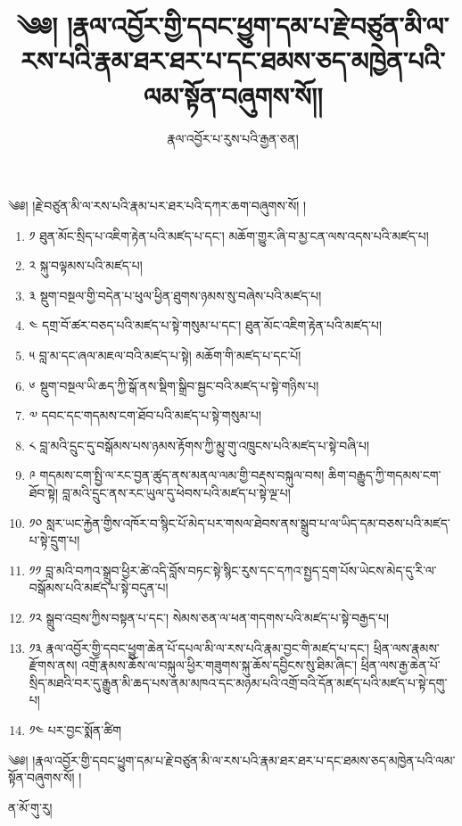 \documentclass{article}
\title{༄༅། །རྣལ་འབྱོར་གྱི་དབང་ཕྱུག་དམ་པ་རྗེ་བཙུན་མི་ལ་རས་པའི་རྣམ་ཐར་ཐར་པ་དང་ཐམས་ཅད་མཁྱེན་པའི་ལམ་སྟོན་བཞུགས་སོ།།}
\author{རྣལ་འབྱོར་པ་རུས་པའི་རྒྱན་ཅན།}
\date{}
\begin{document}
\maketitle

༄༅། །རྗེ་བཙུན་མི་ལ་རས་པའི་རྣམ་པར་ཐར་པའི་དཀར་ཆག་བཞུགས་སོ། །


\begin{enumerate}
    \item ༡ ཐུན་མོང་སྲིད་པ་འཇིག་རྟེན་པའི་མཛད་པ་དང་། མཆོག་གྱུར་ཞི་བ་མྱ་ངན་ལས་འདས་པའི་མཛད་པ།
    \item ༢ སྐུ་བལྟམས་པའི་མཛད་པ།
    \item ༣ སྡུག་བསྔལ་གྱི་བདེན་པ་ཕུལ་ཕྱིན་ཐུགས་ཉམས་སུ་བཞེས་པའི་མཛད་པ།
    \item ༤ དགྲ་བོ་ཚར་བཅད་པའི་མཛད་པ་སྟེ་གསུམ་པ་དང་། ཐུན་མོང་འཇིག་རྟེན་པའི་མཛད་པ།
    \item ༥ བླ་མ་དང་ཞལ་མཇལ་བའི་མཛད་པ་སྟེ། མཆོག་གི་མཛད་པ་དང་པོ།
    \item ༦ སྡུག་བསྔལ་ཡི་ཆད་ཀྱི་སྒོ་ནས་སྡིག་སྒྲིབ་སྦྱང་བའི་མཛད་པ་སྟེ་གཉིས་པ།
    \item ༧ དབང་དང་གདམས་ངག་ཐོབ་པའི་མཛད་པ་སྟེ་གསུམ་པ།
    \item ༨ བླ་མའི་དྲུང་དུ་བསྒོམས་པས་ཉམས་རྟོགས་ཀྱི་མྱུ་གུ་འཁྲུངས་པའི་མཛད་པ་སྟེ་བཞི་པ།
    \item ༩ གདམས་ངག་སྤྱི་ལ་རང་བྱན་ཚུད་ནས་མནལ་ལམ་གྱི་བརྡས་བསྐུལ་བས། ཆིག་བརྒྱུད་ཀྱི་གདམས་ངག་ཐོབ་སྟེ། བླ་མའི་དྲུང་ནས་རང་ཡུལ་དུ་ཕེབས་པའི་མཛད་པ་སྟེ་ལྔ་པ།
    \item ༡༠ སླར་ཡང་རྐྱེན་གྱིས་འཁོར་བ་སྙིང་པོ་མེད་པར་གསལ་ཐེབས་ནས་སྒྲུབ་པ་ལ་ཡིད་དམ་བཅས་པའི་མཛད་པ་སྟེ་དྲུག་པ།
    \item ༡༡ བླ་མའི་བཀའ་སྒྲུབ་ཕྱིར་ཚེ་འདི་བློས་བཏང་སྟེ་སྙིང་རུས་དང་དཀའ་སྤྱད་དྲག་པོས་ཡེངས་མེད་དུ་རི་ལ་བསྒོམས་པའི་མཛད་པ་སྟེ་བདུན་པ།
    \item ༡༢ སྒྲུབ་འབྲས་ཀྱིས་བསྟན་པ་དང་། སེམས་ཅན་ལ་ཕན་གདགས་པའི་མཛད་པ་སྟེ་བརྒྱད་པ།
    \item ༡༣ རྣལ་འབྱོར་གྱི་དབང་ཕྱུག་ཆེན་པོ་དཔལ་མི་ལ་རས་པའི་རྣམ་བྱང་གི་མཛད་པ་དང་། ཕྲིན་ལས་རྣམས་རྫོགས་ནས། འགྲོ་རྣམས་ཆོས་ལ་བསྐུལ་ཕྱིར་གཟུགས་སྐུ་ཆོས་དབྱིངས་སུ་ཐིམ་ཞིང་། ཕྲིན་ལས་རྒྱ་ཆེན་པོ་སྲིད་མཐའི་བར་དུ་རྒྱུན་མི་ཆད་པས་ནམ་མཁའ་དང་མཉམ་པའི་འགྲོ་བའི་དོན་མཛད་པའི་མཛད་པ་སྟེ་དགུ་པ།
    \item ༡༤ པར་བྱང་སྨོན་ཚིག
\end{enumerate}


༄༅། །རྣལ་འབྱོར་གྱི་དབང་ཕྱུག་དམ་པ་རྗེ་བཙུན་མི་ལ་རས་པའི་རྣམ་ཐར་ཐར་པ་དང་ཐམས་ཅད་མཁྱེན་པའི་ལམ་སྟོན་བཞུགས་སོ། །

ན་མོ་གུ་རུ།
\end{document}
